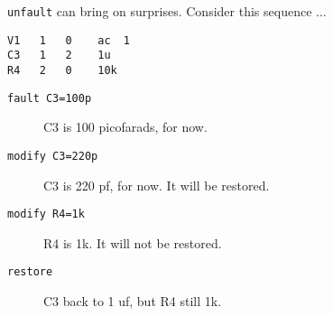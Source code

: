 {\tt unfault} can bring on surprises.  Consider this sequence ...

\begin{verbatim}
V1   1   0    ac  1
C3   1   2    1u
R4   2   0    10k
\end{verbatim}

\begin{description}

\item[{\tt fault C3=100p}] C3 is 100 picofarads, for now.

\item[{\tt modify C3=220p}] C3 is 220 pf, for now.  It will be restored.

\item[{\tt modify R4=1k}] R4 is 1k.  It will not be restored.

\item[{\tt restore}] C3 back to 1 uf, but R4 still 1k.

\end{description}
